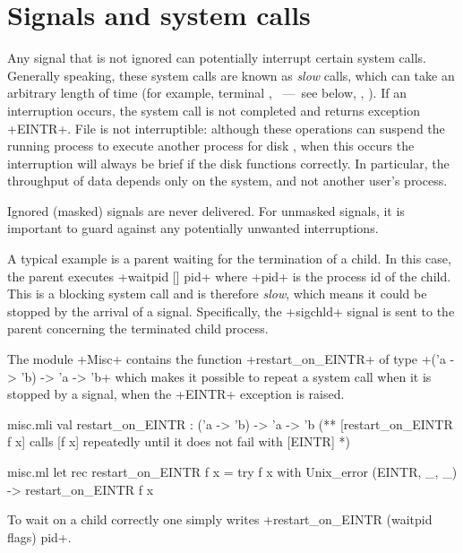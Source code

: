 \section{Signals and system calls} 

Any signal that is not ignored can potentially interrupt 
certain system calls.  Generally speaking, these system calls are 
known as \emph{slow} calls, which can take an arbitrary length of time (for
example, terminal \io, ~---~see below, , \etc).
If an interruption occurs, the system call is not completed and
returns exception \ml+EINTR+.  File \io{} is not interruptible:
although these operations can suspend the running process to 
execute another process for disk \io{}, when this occurs the interruption
will always be brief if the disk functions correctly.  In particular, 
the throughput of data depends only on the system, and not another user's
process.

Ignored (masked) signals are never delivered.  For unmasked 
signals, it is important to guard against any potentially 
unwanted interruptions.

A typical example is a parent waiting for the termination of a child.
In this case, the parent executes \ml+waitpid [] pid+ where \ml+pid+ 
is the process id of the child.  This is a blocking system call and 
is therefore \emph{slow}, which means it could be stopped by the 
arrival of a signal.  Specifically, the \ml+sigchld+ signal is sent 
to the parent concerning the terminated child process.

The module \ml+Misc+ contains the function
\ml+restart_on_EINTR+ of type \ml+('a -> 'b) -> 'a -> 'b+ which
makes it possible to repeat a system call when it is stopped
by a signal, \ie{} when the \ml+EINTR+ exception is raised.

%
\begin{codefile}{misc.mli}
val restart_on_EINTR : ('a -> 'b) -> 'a -> 'b
(** [restart_on_EINTR f x] calls [f x] repeatedly until it does not fail
with [EINTR] *)
\end{codefile}
%
\begin{listingcodefile}{misc.ml}
let rec restart_on_EINTR f x = 
  try f x with Unix_error (EINTR, _, _) -> restart_on_EINTR f x
\end{listingcodefile}
\label{restart_on_EINTR}%
To wait on a child correctly one simply writes
\ml+restart_on_EINTR (waitpid flags) pid+.

